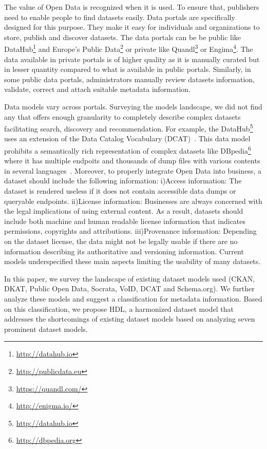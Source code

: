 \documentclass[runningheads,a4paper]{llncs}
\begin{document}
The value of Open Data is recognized when it is used. To ensure that, publishers need to enable people to find datasets easily. Data portals are specifically designed for this purpose. They make it easy for individuals and organizations to store, publish and discover datasets. The data portals can be be public like DataHub\footnote{\url{http://datahub.io}} and Europe's Public Data\footnote{\url{http://publicdata.eu}} or private like Quandl\footnote{\url{https://quandl.com/}} or Engima\footnote{\url{http://enigma.io/}}. The data available in private portals is of higher quality as it is manually curated but in lesser quantity compared to what is available in public portals. Similarly, in some public data portals, administrators manually review datasets information, validate, correct and attach suitable metadata information.

Data models vary across portals. Surveying the models landscape, we did not find any that offers enough granularity to completely describe complex datasets facilitating search, discovery and recommendation. For example, the DataHub\footnote{\url{http://datahub.io}} uses an extension of the Data Catalog Vocabulary (DCAT)~\cite{Erickson:14:DCV}. This data model prohibits a semantically rich representation of complex datasets like DBpedia\footnote{\url{http://dbpedia.org}} where it has multiple endpoits and thousands of dump files with various contents in several languages~\cite{Brummer:2014:DTS:2660517.2660538}. Moreover, to properly integrate Open Data into business, a dataset should include the following information: i)Access information: The dataset is rendered useless if it does not contain accessible data dumps or queryable endpoints. ii)License information: Businesses are always concerned with the legal implications of using external content. As a result, datasets should include both machine and human readable license information that indicates permissions, copyrights and attributions. iii)Provenance information: Depending on the dataset license, the data might not be legally usable if there are no information describing its authoritative and versioning information. Current models underspecified these main aspects limiting the usability of many datasets.

In this paper, we survey the landscape of existing dataset models used (CKAN, DKAT, Public Open Data, Socrata, VoID, DCAT and Schema.org). We further analyze these models and suggest a classification for metadata information. Based on this classification, we propose HDL, a harmonized dataset model that addresses the shortcomings of existing dataset models based on analyzing seven prominent dataset models.
\end{document}
